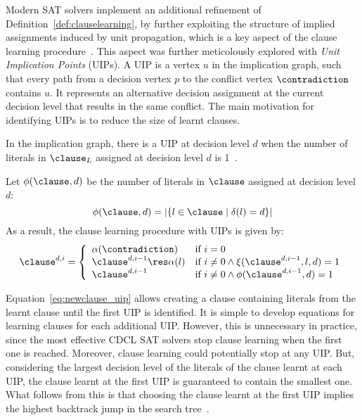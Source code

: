 Modern SAT solvers implement an additional refinement of
Definition~\ref{def:clauselearning}, by further exploiting the structure of
implied assignments induced by unit propagation, which is a key aspect of the
clause learning procedure~\cite{silva1997grasp}. This aspect was further
meticolously explored with \emph{Unit Implication Points} (UIPs). A UIP is a
vertex $u$ in the implication graph, such that every path from a decision vertex
$p$ to the conflict vertex $\contradiction$ contains $u$. It represents an
alternative decision assignment at the current decision level that results in
the same conflict. The main motivation for identifying UIPs is to reduce the
size of learnt clauses. 

In the implication graph, there is a UIP at decision level $d$ when the number
of literals in $\clause_L$ assigned at decision level $d$ is
1~\cite{cdclchapter}. 

\begin{definition}
    Let $\phi(\clause,d)$ be the number of literals in $\clause$ assigned at
    decision level $d$:
    \begin{equation}
        \phi(\clause,d) = |\{l \in \clause\;|\;\delta(l) = d\}|
    \end{equation}
    As a result, the clause learning procedure with UIPs is given by:
    \begin{equation}%
        \label{eq:newclause_uip}
        \clause^{d,i} = 
        \left\{
            \begin{array}{ll}
                \alpha(\contradiction) & \text{if $i=0$}\\
                \clause^{d,i-1} \res \alpha(l) & \text{if $i \neq 0 \land \xi(\clause^{d,i-1}, l, d) = 1$}\\
                \clause^{d, i-1} & \text{if $i \neq 0 \land \phi(\clause^{d,i-1}, d) = 1$}
            \end{array}
        \right.
    \end{equation}
\end{definition}

Equation~\ref{eq:newclause_uip} allows creating a clause containing literals
from the learnt clause until the first UIP is identified. It is simple to
develop equations for learning clauses for each additional UIP\@. However, this
is unnecessary in practice, since the most effective CDCL SAT solvers stop
clause learning when the first one is reached. Moreover, clause learning could
potentially stop at any UIP\@. But, considering the largest decision level of the
literals of the clause learnt at each UIP, the clause learnt at the first UIP is
guaranteed to contain the smallest one. What follows from this is that choosing
the clause learnt at the first UIP implies the highest backtrack jump in the
search tree~\cite{cdclchapter}. 

